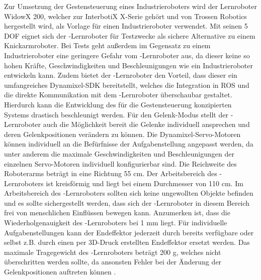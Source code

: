 Zur Umsetzung der Gestensteuerung eines Industrieroboters wird der Lernroboter WidowX 200, welcher zur InterbotiX X-Serie gehört und von Trossen Robotics hergestellt wird, als Vorlage für einen Industrieroboter verwendet. Mit seinen 5 DOF eignet sich der -Lernroboter für Testzwecke als sichere Alternative zu einem Knickarmroboter. Bei Tests geht außerdem im Gegensatz zu einem Industrieroboter eine geringere Gefahr vom -Lernroboter aus, da dieser keine so hohen Kräfte, Geschwindigkeiten und Beschleunigungen wie ein Industrieroboter entwickeln kann. Zudem bietet der -Lernroboter den Vorteil, dass dieser ein umfangreiches Dynamixel-SDK bereitstellt, welches die Integration in ROS und die direkte Kommunikation mit dem -Lernroboter überschaubar gestaltet. Hierdurch kann die Entwicklung des für die Gestensteuerung konzipierten Systems drastisch beschleunigt werden. Für den Gelenk-Modus stellt der -Lernroboter auch die Möglichkeit bereit die Gelenke individuell ansprechen und deren Gelenkpositionen verändern zu können. Die Dynamixel-Servo-Motoren können individuell an die Befürfnisse der Aufgabenstellung angepasst werden, da unter anderem die maximale Geschwindigkeiten und Beschleunigungen der einzelnen Servo-Motoren individuell konfigurierbar sind. Die Reichweite des Roboterarms beträgt in eine Richtung \num{55} cm. Der Arbeitsbereich des -Lernroboters ist kreisförmig und liegt bei einem Durchmesser von \num{110} cm. Im Arbeitsbereich des -Lernroboters sollten sich keine ungewollten Objekte befinden und es sollte sichergestellt werden, dass sich der -Lernroboter in diesem Bereich frei von menschlichen Einflüssen bewegen kann. Anzumerken ist, dass die Wiederholgenauigkeit des -Lernroboters bei \num{1} mm liegt. Für individuelle Aufgabenstellungen kann der Endeffektor jederzeit durch bereits verfügbare oder selbst z.B. durch einen per 3D-Druck erstellten Endeffektor ersetzt werden. Das maximale Tragegewicht des -Lernroboters beträgt 200 g, welches nicht überschritten werden sollte, da ansonsten Fehler bei der Änderung der Gelenkpositionen auftreten können \cite{widowx_200_nodate}.\\

